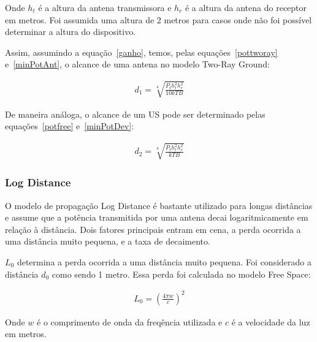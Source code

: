 Onde \begin{math}h_t\end{math} é a altura da antena transmissora e \begin{math}h_r\end{math} é a altura da antena do receptor em metros. Foi assumida uma altura de 2 metros para casos onde não foi possível determinar a altura do dispositivo.

Assim, assumindo a equação~\ref{ganho}, temos, pelas equações~\ref{pottworay} e~\ref{minPotAnt}, o alcance de uma antena no modelo Two-Ray Ground:

\begin{align}
  \label{dTwoRayAnt} d_1 = \sqrt[4]{\frac{P_th_t^{2}h_r^{2}}{10kTB}}
\end{align}

De maneira análoga, o alcance de um US pode ser determinado pelas equações~\ref{potfree} e~\ref{minPotDev}:

\begin{align}
  \label{dTwoRayDev} d_2 = \sqrt[4]{\frac{P_th_t^{2}h_r^{2}}{kTB}}
\end{align}


\subsubsection{Log Distance}

O modelo de propagação Log Distance é bastante utilizado para longas distâncias e assume que a potência transmitida por uma antena decai logaritmicamente em relação à distância. Dois fatores principais entram em cena, a perda ocorrida a uma distância muito pequena, e a taxa de decaimento.

\begin{math}L_0\end{math} determina a perda ocorrida a uma distância muito pequena. Foi considerado a distância \begin{math}d_0\end{math} como sendo 1 metro. Essa perda foi calculada no modelo Free Space:

\begin{align}
  \label{L0} L_0 = \left( \frac{4\pi w}{c}\right)^{2}
\end{align}

Onde \begin{math}w\end{math} é o comprimento de onda da freqência utilizada e \begin{math}c\end{math} é a velocidade da luz em metros.

